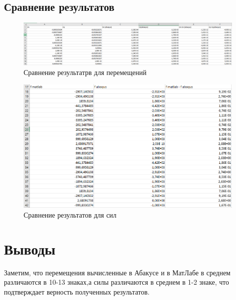\documentclass[12pt,a4paper]{article}
\begin{document}
	\subsection{Сравнение результатов}
	\begin{figure}[H]
		\centering
		\includegraphics[scale=0.4]{compare_u}
		\caption{Сравнение результатрв для перемещений}
		\label{pic7}
	\end{figure}
	\begin{figure}[H]
		\centering
		\includegraphics[scale=0.6]{compare_f}
		\caption{Сравнение результатов для сил}
		\label{pic8}
	\end{figure}
\section*{Выводы}
	Заметим, что  перемещения вычисленные в Абакусе и в МатЛабе в среднем различаются в 10-13 знаках,а силы различаются в среднем в 1-2 знаке, что подтверждает верность полученных результатов.
\end{document}
